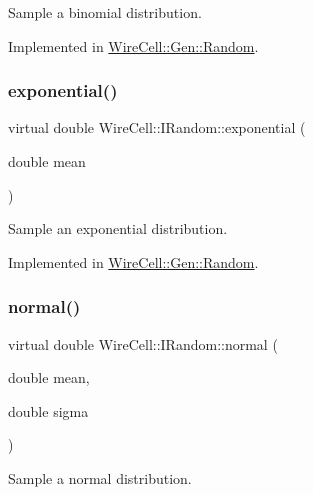 Sample a binomial distribution. 



Implemented in \hyperlink{class_wire_cell_1_1_gen_1_1_random_afb7a7a30f4f5c70a6388dc47c6464153}{Wire\+Cell\+::\+Gen\+::\+Random}.

\mbox{\label{class_wire_cell_1_1_i_random_a093f57116384dacdf0bc68ae4373ae49}} 
\subsubsection{\texorpdfstring{exponential()}{exponential()}}
{\footnotesize\ttfamily virtual double Wire\+Cell\+::\+I\+Random\+::exponential (\begin{DoxyParamCaption}\item[{double}]{mean }\end{DoxyParamCaption})\hspace{0.3cm}{\ttfamily [pure virtual]}}



Sample an exponential distribution. 



Implemented in \hyperlink{class_wire_cell_1_1_gen_1_1_random_adc1edd1dadf04f9e78d1c6480f6f4f1a}{Wire\+Cell\+::\+Gen\+::\+Random}.

\mbox{\label{class_wire_cell_1_1_i_random_a6a24d8800300de9f8b735277dc0268d4}} 
\subsubsection{\texorpdfstring{normal()}{normal()}}
{\footnotesize\ttfamily virtual double Wire\+Cell\+::\+I\+Random\+::normal (\begin{DoxyParamCaption}\item[{double}]{mean,  }\item[{double}]{sigma }\end{DoxyParamCaption})\hspace{0.3cm}{\ttfamily [pure virtual]}}



Sample a normal distribution. 




